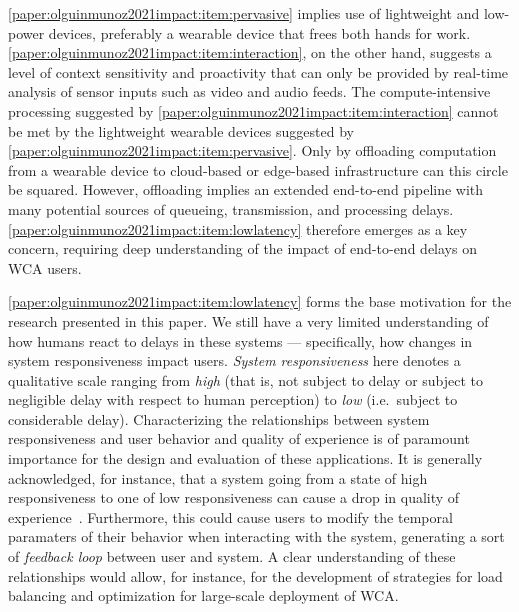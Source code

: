 \cref{paper:olguinmunoz2021impact:item:pervasive} implies use of lightweight and low-power devices, preferably a wearable device that frees both hands for work.
\cref{paper:olguinmunoz2021impact:item:interaction}, on the other hand, suggests a level of context sensitivity and proactivity that can only be provided by real-time analysis of sensor inputs such as video and audio feeds.
The compute-intensive processing suggested by \cref{paper:olguinmunoz2021impact:item:interaction} cannot be met by the lightweight wearable devices suggested by \cref{paper:olguinmunoz2021impact:item:pervasive}.
Only by offloading computation from a wearable device to cloud-based or edge-based infrastructure can this circle be squared.
However, offloading implies an extended end-to-end pipeline with many potential sources of queueing, transmission, and processing delays.
\cref{paper:olguinmunoz2021impact:item:lowlatency} therefore emerges as a key concern, requiring deep understanding of the impact of end-to-end delays on \gls{WCA} users.

\cref{paper:olguinmunoz2021impact:item:lowlatency} forms the base motivation for the research presented in this paper.
We still have a very limited understanding of how humans react to delays in these systems --- specifically, how changes in system responsiveness impact users.
\emph{System responsiveness} here denotes a qualitative scale ranging from \emph{high} (that is, not subject to delay or subject to negligible delay with respect to human perception) to \emph{low} (i.e.\ subject to considerable delay).
Characterizing the relationships between system responsiveness and user behavior and quality of experience is of paramount importance for the design and evaluation of these applications.
It is generally acknowledged, for instance, that a system going from a state of high responsiveness to one of low responsiveness can cause a drop in quality of experience~\cite{dabrowski201140}.
Furthermore, this could cause users to modify the temporal paramaters of their behavior when interacting with the system, generating a sort of \emph{feedback loop} between user and system.
A clear understanding of these relationships would allow, for instance, for the development of strategies for load balancing and optimization for large-scale deployment of \gls{WCA}.\@


